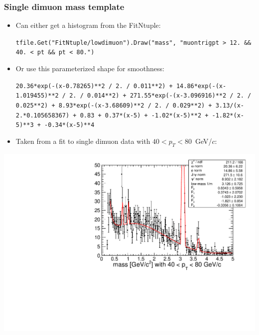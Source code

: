 \documentclass[compress]{beamer}
\begin{document}
\begin{frame}
\frametitle{Single dimuon mass template}

\begin{itemize}
\item Can either get a histogram from the FitNtuple:

{\tt \tiny tfile.Get("FitNtuple/lowdimuon").Draw("mass", "muontrigpt > 12. \&\& 40. < pt \&\& pt < 80.")}

\item Or use this parameterized shape for smoothness:

{\tt \tiny 20.36*exp(-(x-0.78265)**2 / 2. / 0.011**2) + 14.86*exp(-(x-1.019455)**2 / 2. / 0.014**2) + 271.55*exp(-(x-3.096916)**2 / 2. / 0.025**2) + 8.93*exp(-(x-3.68609)**2 / 2. / 0.029**2) + 3.13/(x-2.*0.105658367) + 0.83 + 0.37*(x-5) + -1.02*(x-5)**2 + -1.82*(x-5)**3 + -0.34*(x-5)**4}

\item Taken from a fit to single dimuon data with $40 < p_T < 80$~GeV/$c$:
\end{itemize}
\begin{center}
\includegraphics[width=0.5\linewidth]{lowdimuon_40-80_backgroundfit_zoom.pdf}
\end{center}
\end{frame}
\end{document}
